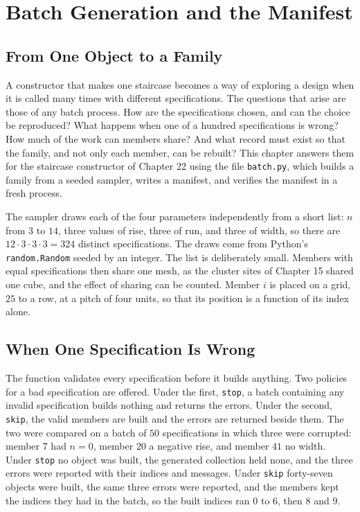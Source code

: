 \chapter{Batch Generation and the Manifest}

\section{From One Object to a Family}

A constructor that makes one staircase becomes a way of exploring a design when it is called many times with different specifications. The questions that arise are those of any batch process. How are the specifications chosen, and can the choice be reproduced? What happens when one of a hundred specifications is wrong? How much of the work can members share? And what record must exist so that the family, and not only each member, can be rebuilt? This chapter answers them for the staircase constructor of Chapter 22 using the file \texttt{batch.py}, which builds a family from a seeded sampler, writes a manifest, and verifies the manifest in a fresh process.

The sampler draws each of the four parameters independently from a short list: $n$ from $3$ to $14$, three values of rise, three of run, and three of width, so there are $12\cdot3\cdot3\cdot3=324$ distinct specifications. The draws come from Python's \texttt{random.Random} seeded by an integer. The list is deliberately small. Members with equal specifications then share one mesh, as the cluster sites of Chapter 15 shared one cube, and the effect of sharing can be counted. Member $i$ is placed on a grid, $25$ to a row, at a pitch of four units, so that its position is a function of its index alone.



\section{When One Specification Is Wrong}

The function validates every specification before it builds anything. Two policies for a bad specification are offered. Under the first, \texttt{stop}, a batch containing any invalid specification builds nothing and returns the errors. Under the second, \texttt{skip}, the valid members are built and the errors are returned beside them. The two were compared on a batch of $50$ specifications in which three were corrupted: member $7$ had $n=0$, member $20$ a negative rise, and member $41$ no width. Under \texttt{stop} no object was built, the generated collection held none, and the three errors were reported with their indices and messages. Under \texttt{skip} forty-seven objects were built, the same three errors were reported, and the members kept the indices they had in the batch, so the built indices ran $0$ to $6$, then $8$ and $9$.


